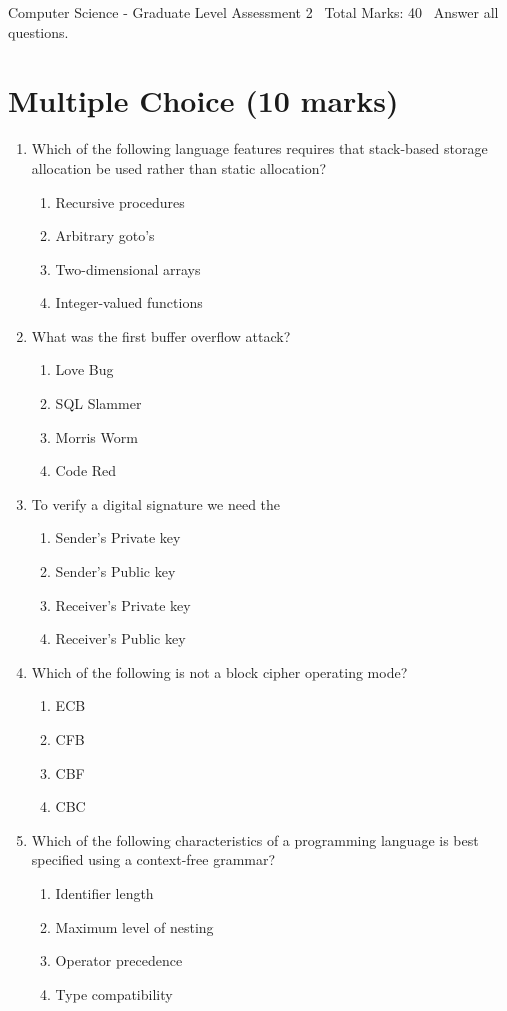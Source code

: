 \documentclass[12pt]{article}
\begin{document}
\begin{center}
Computer Science - Graduate Level Assessment 2 \
Total Marks: 40 \
Answer all questions.
\end{center}

\section*{Multiple Choice (10 marks)}
\begin{enumerate}[label=\arabic*.]
\item Which of the following language features requires that stack-based storage allocation be used rather than static allocation?
\begin{enumerate}[label=(\alph*)]
    \item Recursive procedures
    \item Arbitrary goto's
    \item Two-dimensional arrays
    \item Integer-valued functions
\end{enumerate}
\item What was the first buffer overflow attack?
\begin{enumerate}[label=(\alph*)]
    \item Love Bug
    \item SQL Slammer
    \item Morris Worm
    \item Code Red
\end{enumerate}
\item To verify a digital signature we need the
\begin{enumerate}[label=(\alph*)]
    \item Sender's Private key
    \item Sender's Public key
    \item Receiver's Private key
    \item Receiver's Public key
\end{enumerate}
\item Which of the following is not a block cipher operating mode?
\begin{enumerate}[label=(\alph*)]
    \item ECB
    \item CFB
    \item CBF
    \item CBC
\end{enumerate}
\item Which of the following characteristics of a programming language is best specified using a context-free grammar?
\begin{enumerate}[label=(\alph*)]
    \item Identifier length
    \item Maximum level of nesting
    \item Operator precedence
    \item Type compatibility
\end{enumerate}
\end{enumerate}
\end{document}
